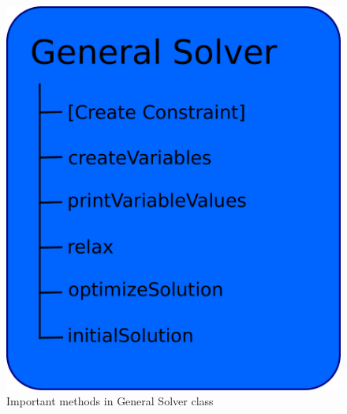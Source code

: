 \begin{figure}[!b]
\begin{center}
 \includegraphics[width=\linewidth/2]{general.pdf} \caption{Important methods in General Solver 
class}\label{fig_general}
\end{center} 
\end{figure}
